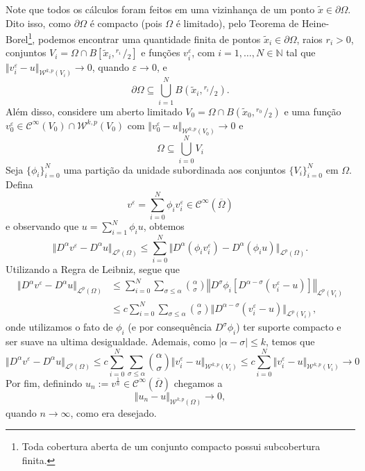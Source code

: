 \documentclass[a4paper, 11pt]{book}
\theoremstyle{definition}
\newcommand{\bN}{\mathbb{N}}
\newcommand{\cC}{\mathcal{C}}
\newcommand{\cL}{\mathcal{L}}
\newcommand{\cW}{\mathcal{W}}
\newcommand{\sfrac}[2]{{}^{#1}\!\!/\!_{#2}}
\begin{document}
\begin{prf}
    Note que todos os cálculos foram feitos em uma vizinhança de um ponto $\tilde x \in \partial\Omega$. Dito isso, como $\partial \Omega$ é compacto (pois $\Omega$ é limitado), pelo Teorema de Heine-Borel\footnote{Toda cobertura aberta de um conjunto compacto possui subcobertura finita.}, podemos encontrar uma quantidade finita de pontos $\tilde x_i \in \partial \Omega$, raios $r_i > 0$, conjuntos $V_i = \Omega \cap B[\tilde x_i,\sfrac{r_i\,}{2}]$ e funções $v_i^\varepsilon$, com $i = 1,\dots,N \in \bN$ tal que $\Vert v_i^\varepsilon - u \Vert_{\cW^{k,p}(V_i)} \to 0$, quando $\varepsilon \to 0$, e 
    \[
        \partial\Omega \subseteq \bigcup_{i=1}^N B(\tilde x_i, \sfrac{r_i}{2}).
    \]
    Além disso, considere um aberto limitado $V_0 = \Omega \cap B(\tilde x_0, \sfrac{r_0\,}{2})$ e uma função $v^\varepsilon_0 \in \cC^{\infty}(V_0) \cap \cW^{k,p}(V_0)$ com $\Vert v^\varepsilon_0 - u \Vert_{\cW^{k,p}(V_0)} \to 0$ e
    \[
        \Omega \subseteq \bigcup_{i=0}^N V_i
    \]
    Seja $\{\phi_i\}_{i=0}^N$ uma partição da unidade subordinada aos conjuntos $\{V_i\}_{i=0}^N$ em $\Omega$.
    Defina
    \[
        v^\varepsilon = \sum_{i=0}^N \phi_i v_i^\varepsilon \in \cC^{\infty}(\overline\Omega)
    \]
    e observando que $u = \sum_{i=1}^N \phi_i u$, obtemos
    \[
        \Vert D^\alpha v^\varepsilon - D^\alpha u \Vert_{\cL^p(\Omega)} \leqslant \sum_{i=0}^N \Vert D^\alpha (\phi_i v_i^\varepsilon) - D^\alpha(\phi_i u) \Vert_{\cL^p(\Omega)}.
    \]
    Utilizando a Regra de Leibniz, segue que
    \[
        \begin{aligned}
            \Vert D^\alpha v^\varepsilon - D^\alpha u \Vert_{\cL^p(\Omega)} &\leqslant \sum_{i=0}^N\sum_{\sigma \leqslant \alpha} \binom{\alpha}{\sigma} \left\Vert  D^{\sigma} \phi_i \left[ D^{\alpha - \sigma} \left( v_i^\varepsilon - u \right) \right] \right\Vert _{\cL^p(V_i)}\\ 
            &\leqslant c\sum_{i=0}^N\sum_{\sigma \leqslant \alpha} \binom{\alpha}{\sigma} \Vert D^{\alpha-\sigma}(v^\varepsilon_i - u) \Vert_{\cL^p(V_i)},
        \end{aligned}
    \]
    onde utilizamos o fato de $\phi_i$ (e por consequência $D^\sigma \phi_i$) ter suporte compacto e ser suave na ultima desigualdade. 
    Ademais, como $|\alpha - \sigma| \leqslant k$, temos que
    \[
        \Vert D^\alpha v^\varepsilon - D^\alpha u \Vert_{\cL^p(\Omega)} \leqslant c \sum_{i=0}^N\sum_{\sigma \leqslant \alpha} \binom{\alpha}{\sigma} \Vert v_i^\varepsilon - u \Vert_{\cW^{k,p}(V_i)} \leqslant c\sum_{i=0}^N \Vert v_i^\varepsilon - u \Vert_{\cW^{k,p}(V_i)} \to 0 
    \]
    Por fim, definindo $u_n := v^{\frac{1}{n}} \in \cC^{\infty}(\overline\Omega)$ chegamos a 
    \[
        \Vert u_n - u \Vert_{\cW^{k,p}(\Omega)} \to 0,
    \]
    quando $n \to \infty$, como era desejado.
\end{prf}
\end{document}
